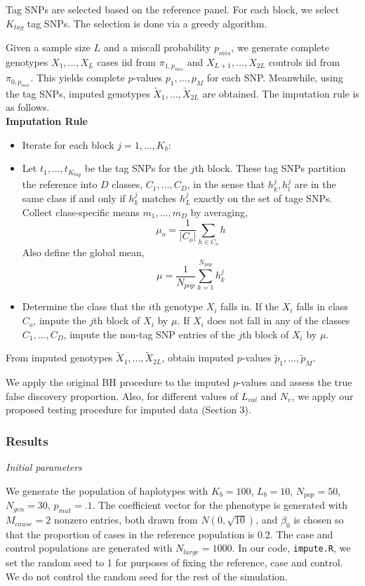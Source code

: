 \documentclass[12pt]{article}
\begin{document}
Tag SNPs are selected based on the reference panel.
For each block, we select $K_{tag}$ tag SNPs.
The selection is done via a greedy algorithm.

Given a sample size $L$ and a miscall probability $p_{mis}$,
we generate complete genotypes $X_1,\hdots,X_L$ cases iid from $\pi_{1,p_{mis}}$ and 
$X_{L+1},\hdots,X_{2L}$ controls iid from $\pi_{0,p_{mis}}$.
This yields complete $p$-values $p_1,\hdots,p_M$ for each SNP.
Meanwhile, using the tag SNPs, imputed genotypes
$\tilde{X}_1,\hdots,\tilde{X}_{2L}$ are obtained.
The imputation rule is as follows.
\[\]
\noindent\textbf{Imputation Rule}
\begin{itemize}
\item Iterate for each block $j=1,\hdots,K_b$:
\item Let $t_1,\hdots,t_{K_{tag}}$ be the tag SNPs for the $j$th
  block.
These tag SNPs partition the reference into $D$ classes,
$C_1,\hdots,C_D$,
in the sense that $h^j_k, h^j_l$ are in the same class if and only if
$h^j_k$ matches $h^j_L$ exactly on the set of tage SNPs.
Collect class-specific means $m_1,\hdots,m_D$ by averaging,
\[
\mu_o = \frac{1}{|C_o|}\sum_{h \in C_o} h
\]
Also define the global mean,
\[
\mu = \frac{1}{N_{pop}}\sum_{k=1}^{N_{pop}} h^j_k
\]
\item Determine the class that the $i$th genotype $X_i$ falls in.
If the $X_i$ falls in class $C_o$, impute the $j$th block of $X_i$
by $\mu$.
If $X_i$ does not fall in any of the classes $C_1,\hdots,C_D$,
impute the non-tag SNP entries of the $j$th block of $X_i$ by $\mu$.
\end{itemize}

From imputed genotypes
$\tilde{X}_1,\hdots,\tilde{X}_{2L}$, obtain imputed $p$-values
$\tilde{p}_1,\hdots,\tilde{p}_M$.

We apply the original BH procedure to the imputed $p$-values
and assess the true false discovery proportion.
Also, for different values of $L_{val}$ and $N_v$,
we apply our proposed testing procedure for imputed data (Section 3).

\subsubsection{Results}

\noindent\emph{Initial parameters}

We generate the population of haplotypes with $K_b = 100$, $L_b = 10$,
$N_{pop}=50$, $N_{gen}=30$, $p_{mut}=.1$.
The coefficient vector for the phenotype is generated with
$M_{cause}=2$ nonzero entries, both drawn from $N(0,\sqrt{10})$,
and $\beta_0$ is chosen so that the proportion of cases in the
reference population is 0.2.
The case and control populations are generated with $N_{large}=1000$.
In our code, \texttt{impute.R}, we set the random seed to 1
for purposes of fixing the reference, case and control.
We do not control the random seed for the rest of the simulation.
\end{document}
